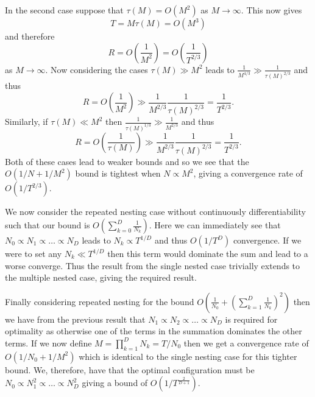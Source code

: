 In the second case suppose that $\tau(M) = O(M^2)$ as $M \to \infty$.  This now gives
\[
  T = M \tau(M)
  = O\left(M^3\right)
\]
and therefore
\[
R = O\left(\frac{1}{M^2}\right) = O\left(\frac{1}{T^{2/3}}\right)
\]
as $M \to \infty$.  Now considering the cases $\tau(M) \gg M^2$ leads to $\frac{1}{M^{4/3}}  \gg \frac{1}{\tau(M)^{2/3}}$ and thus
\[
R = O\left(\frac{1}{M^2}\right) \gg \frac{1}{M^{2/3}} \frac{1}{\tau(M)^{2/3}} = \frac{1}{T^{2/3}}.
\]
Similarly, if $\tau(M) \ll M^2$ then $\frac{1}{\tau(M)^{1/3}}\gg \frac{1}{M^{2/3}}$ and thus
\[
R = O\left(\frac{1}{\tau(M)}\right) \gg \frac{1}{M^{2/3}} \frac{1}{\tau(M)^{2/3}} = \frac{1}{T^{2/3}}.
\]
Both of these cases lead to weaker bounds and so we see that the $O(1/N + 1/M^2)$ bound
is tightest when $N \propto M^2$, giving a convergence rate of $O(1/T^{2/3})$.

We now consider the repeated nesting case without continuously differentiability such that our
bound is $O\left(\sum_{k=0}^{D} \frac{1}{N_k}\right)$.  Here we can immediately see that
$N_0 \propto N_1 \propto \dots \propto N_D$ leads to $N_k \propto T^{1/D}$ and thus
 $O(1/T^{D})$ convergence.  If we were to set any $N_k \ll T^{1/D}$ then this term would
 dominate the sum and lead to a worse converge.  Thus the result from the single nested case
 trivially extends to the multiple nested case, giving the required result.
 
 Finally considering repeated nesting for the bound $O\left(\frac{1}{N_0} +\left(\sum_{k=1}^{D} \frac{1}{N_k}\right)^2\right)$
 then we have from the previous result that $N_1 \propto N_2 \propto \dots \propto N_D$
 is required for optimality as otherwise one of the terms in the summation dominates the
 other terms.  If we now define $M=\prod_{k=1}^{D} N_k = T/N_0$ then we get a convergence
 rate of $O(1/N_0+1/M^2)$ which is identical to the single nesting case for this tighter
 bound.  We, therefore, have that the optimal configuration must be
 $N_0 \propto N_1^2 \propto \dots \propto N_D^2$ giving a bound of $O(1/T^{\frac{2}{D+1}})$.